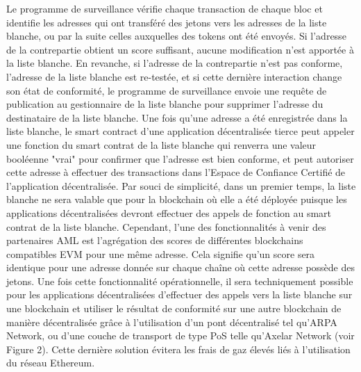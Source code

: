 ﻿\documentclass[a4paper]{article}
\begin{document}
Le programme de surveillance vérifie chaque transaction de chaque bloc et identifie les adresses qui ont transféré des jetons vers les adresses de la liste blanche, ou par la suite celles auxquelles des tokens ont été envoyés. Si l'adresse de la contrepartie obtient un score suffisant, aucune modification n'est apportée à la liste blanche. En revanche, si l'adresse de la contrepartie n'est pas conforme, l'adresse de la liste blanche est re-testée, et si cette dernière interaction change son état de conformité, le programme de surveillance envoie une requête de publication au gestionnaire de la liste blanche pour supprimer l'adresse du destinataire de la liste blanche.
Une fois qu'une adresse a été enregistrée dans la liste blanche, le smart contract d’une application décentralisée tierce peut appeler une fonction du smart contrat de la liste blanche qui renverra une valeur booléenne "vrai" pour confirmer que l'adresse est bien conforme, et peut autoriser cette adresse à effectuer des transactions dans l’Espace de Confiance Certifié de l’application décentralisée.
Par souci de simplicité, dans un premier temps, la liste blanche ne sera valable que pour la blockchain où elle a été déployée puisque les applications décentralisées devront effectuer des appels de fonction au smart contrat de la liste blanche. Cependant, l'une des fonctionnalités à venir des partenaires AML est l'agrégation des scores de différentes blockchains compatibles EVM pour une même adresse. Cela signifie qu'un score sera identique pour une adresse donnée sur chaque chaîne où cette adresse possède des jetons. Une fois cette fonctionnalité opérationnelle, il sera techniquement possible pour les applications décentralisées d’effectuer des appels vers la liste blanche sur une blockchain et utiliser le résultat de conformité sur une autre blockchain de manière décentralisée grâce à l'utilisation d'un pont décentralisé tel qu’ARPA Network, ou d'une couche de transport de type PoS telle qu'Axelar Network (voir Figure 2). 
Cette dernière solution évitera les frais de gaz élevés liés à l'utilisation du réseau Ethereum. \\
\end{document}
